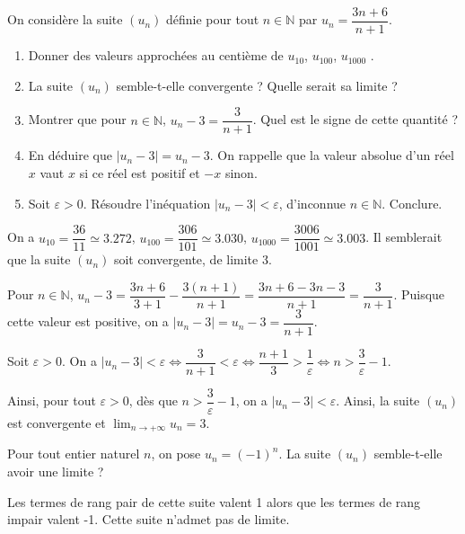 \documentclass[11pt,fleqn]{book} %
\begin{document}
\begin{exercise}[topic=lim01]

On considère la suite $(u_n)$ définie pour tout $n\in\mathbb{N}$ par $u_n=\dfrac{3n+6}{n+1}$.
\begin{enumerate}
\item Donner des valeurs approchées au centième de $u_{10}$, $u_{100}$, $u_{1000}$ .
\item La suite $(u_n)$ semble-t-elle convergente ? Quelle serait sa limite ?
\item Montrer que pour $n\in\mathbb{N}$, $u_n-3=\dfrac{3}{n+1}$. Quel est le signe de cette quantité ?
\item En déduire que $|u_n-3|=u_n-3$. On rappelle que la valeur absolue d'un réel $x$ vaut $x$ si ce réel est positif et $-x$ sinon.
\item Soit $\varepsilon >0$. Résoudre l'inéquation $\left\lvert u_n - 3 \right\rvert < \varepsilon$, d'inconnue $n\in\mathbb{N}$. Conclure.
\end{enumerate}\end{exercise}
\begin{solution}On a $u_{10}=\dfrac{36}{11}\simeq 3.272$, $u_{100}=\dfrac{306}{101}\simeq 3.030$, $u_{1000}=\dfrac{3006}{1001}\simeq 3.003$. Il semblerait que la suite $(u_n)$ soit convergente, de limite 3.

Pour $n\in\mathbb{N}$, $u_n-3=\dfrac{3n+6}{3+1}-\dfrac{3(n+1)}{n+1}=\dfrac{3n+6-3n-3}{n+1}=\dfrac{3}{n+1}$. Puisque cette valeur est positive, on a $|u_n-3|=u_n-3=\dfrac{3}{n+1}$.

Soit $\varepsilon >0$. On a $\left\lvert u_n - 3 \right\rvert < \varepsilon \Leftrightarrow \dfrac{3}{n+1}< \varepsilon \Leftrightarrow \dfrac{n+1}{3} > \dfrac{1}{\varepsilon} \Leftrightarrow n > \dfrac{3}{\varepsilon}-1$.

Ainsi, pour tout $\varepsilon > 0$, dès que $n > \dfrac{3}{\varepsilon}-1$, on a $\left\lvert u_n - 3 \right\rvert < \varepsilon$. Ainsi, la suite $(u_n)$ est convergente et $\displaystyle \lim _{n\to + \infty}u_n=3$.\end{solution}



\begin{exercise}[topic=lim01]Pour tout entier naturel $n$, on pose $u_n=(-1)^n$. La suite $(u_n)$ semble-t-elle avoir une limite ?\end{exercise}
\begin{solution}Les termes de rang pair de cette suite valent 1 alors que les termes de rang impair valent -1. Cette suite n'admet pas de limite.\end{solution}
\end{document}
